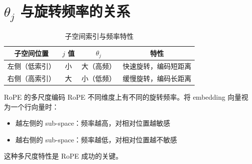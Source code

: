 \section{$\theta_j$ 与旋转频率的关系}

\begin{table}[H]
\centering
\caption{子空间索引与频率特性}
\begin{tabular}{cccc}
\toprule
\textbf{子空间位置} & \textbf{$j$ 值} & \textbf{$\theta_j$} & \textbf{特性} \\
\midrule
左侧（低索引） & 小 & 大（高频） & 快速旋转，编码短距离 \\
右侧（高索引） & 大 & 小（低频） & 缓慢旋转，编码长距离 \\
\bottomrule
\end{tabular}
\end{table}

\begin{knowledgebox}{RoPE 的多尺度编码}
RoPE 不同维度上有不同的旋转频率。将 embedding 向量视为一个行向量时：
\begin{itemize}
  \item 越左侧的 sub-space：频率越高，对相对位置越敏感
  \item 越右侧的 sub-space：频率越低，对相对位置越不敏感
\end{itemize}
这种多尺度特性是 RoPE 成功的关键。
\end{knowledgebox}

